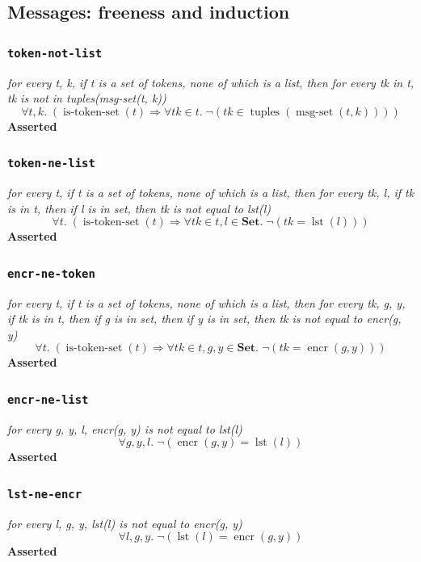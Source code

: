 \documentclass[11pt]{article}
\begin{document}
\subsection{Messages: freeness and induction}

\subsubsection*{\texttt{token-not-list}}
\emph{for every t, k, if t is a set of tokens, none of which is a list, then for every tk in t, tk is not in tuples(msg-set(t, k))}
{\small\[
\forall t, k.\; (\operatorname{is\text{-}token\text{-}set}(t) \Rightarrow \forall \mathit{tk} \in t.\; \neg (\mathit{tk} \in \operatorname{tuples}(\operatorname{msg\text{-}set}(t, k))))
\]}
\noindent\textbf{Asserted}

\subsubsection*{\texttt{token-ne-list}}
\emph{for every t, if t is a set of tokens, none of which is a list, then for every tk, l, if tk is in t, then if l is in set, then tk is not equal to lst(l)}
{\small\[
\forall t.\; (\operatorname{is\text{-}token\text{-}set}(t) \Rightarrow \forall \mathit{tk} \in t, l \in \mathbf{Set}.\; \neg (\mathit{tk} = \operatorname{lst}(l)))
\]}
\noindent\textbf{Asserted}

\subsubsection*{\texttt{encr-ne-token}}
\emph{for every t, if t is a set of tokens, none of which is a list, then for every tk, g, y, if tk is in t, then if g is in set, then if y is in set, then tk is not equal to encr(g, y)}
{\small\[
\forall t.\; (\operatorname{is\text{-}token\text{-}set}(t) \Rightarrow \forall \mathit{tk} \in t, g, y \in \mathbf{Set}.\; \neg (\mathit{tk} = \operatorname{encr}(g, y)))
\]}
\noindent\textbf{Asserted}

\subsubsection*{\texttt{encr-ne-list}}
\emph{for every g, y, l, encr(g, y) is not equal to lst(l)}
{\small\[
\forall g, y, l.\; \neg (\operatorname{encr}(g, y) = \operatorname{lst}(l))
\]}
\noindent\textbf{Asserted}

\subsubsection*{\texttt{lst-ne-encr}}
\emph{for every l, g, y, lst(l) is not equal to encr(g, y)}
{\small\[
\forall l, g, y.\; \neg (\operatorname{lst}(l) = \operatorname{encr}(g, y))
\]}
\noindent\textbf{Asserted}
\end{document}
